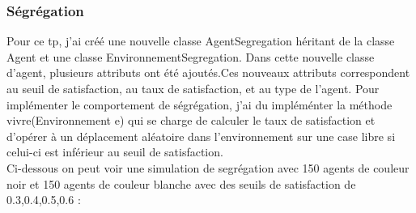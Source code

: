 \documentclass[a4paper,12pt]{report}
\begin{document}
\subsubsection*{Ségrégation}
Pour ce tp, j'ai créé une nouvelle classe AgentSegregation héritant de la classe Agent et une classe EnvironnementSegregation. Dans cette nouvelle classe d'agent, plusieurs attributs ont été ajoutés.Ces nouveaux attributs correspondent au seuil de satisfaction, au taux de satisfaction, et au type de l'agent. Pour implémenter le comportement de ségrégation, j'ai du impléménter la méthode vivre(Environnement e) qui se charge de calculer le taux de satisfaction et d'opérer à un déplacement aléatoire dans l'environnement sur une case libre si celui-ci est inférieur au seuil de satisfaction.\\
Ci-dessous on peut voir une simulation de segrégation  avec 150 agents de couleur noir et 150 agents de couleur blanche avec des seuils de satisfaction de 0.3,0.4,0.5,0.6 :
\end{document}

